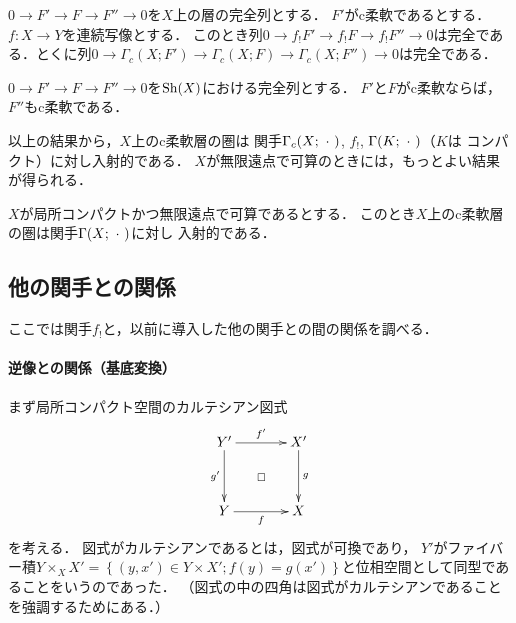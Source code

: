 \begin{leftbar}
\begin{PRP}\label{PRP258}
    \(0\to F'\to F\to F''\to0\)を\(X\)上の層の完全列とする．
    \(F'\)がc柔軟であるとする．\(f\colon X\to Y\)を連続写像とする．
    このとき列\(
        0\to f_{!}F'\to f_{!}F\to f_{!}F''\to0
    \)は完全である．とくに列\(
        0\to\Gamma_{c}(X;F')\to\Gamma_{c}(X;F)\to\Gamma_{c}(X;F'')\to0
    \)は完全である．
\end{PRP}
\end{leftbar}

\begin{leftbar}
\begin{CRL}\label{CRL259}
    \(0\to F'\to F\to F''\to0\)を\(\mathrm{Sh}(X)\)における完全列とする．
    \(F'\)と\(F\)がc柔軟ならば，\(F''\)もc柔軟である．
\end{CRL}
\end{leftbar}

以上の結果から，\(X\)上のc柔軟層の圏は
関手\(\Gamma_{c}(X;\mathord{\ \cdot\ })\), \(f_{!}\), \(\Gamma(K;\mathord{\ \cdot\ })\)（\(K\)は
コンパクト）に対し入射的である．
\(X\)が無限遠点で可算のときには，もっとよい結果が得られる．

\begin{leftbar}
\begin{PRP}\label{PRP2510}
    \(X\)が局所コンパクトかつ無限遠点で可算であるとする．
    このとき\(X\)上のc柔軟層の圏は関手\(\Gamma(X;\mathord{\ \cdot\ })\)に対し
    入射的である．
\end{PRP}
\end{leftbar}

\subsection*{他の関手との関係}

ここでは関手\(f_!\)と，以前に導入した他の関手との間の関係を調べる．
\paragraph{逆像との関係（基底変換）}
まず局所コンパクト空間のカルテシアン図式
\begin{equation}
    \vcenter{\xymatrix@C=36pt@R=36pt{
            Y'
            \ar[r]^-{f'}
            \ar[d]_-{g'}
            \ar@{}[dr]|\square
            &
            X'
            \ar[d]^-{g}
            \\
            Y\ar[r]_-{f}
            &
            X
    }}
\end{equation}
を考える．
図式がカルテシアンであるとは，図式が可換であり，
\(Y'\)がファイバー積\(
    Y\times_{X}X'=\left\{
        (y,x')\in Y\times X';f(y)=g(x')
    \right\}
\)と位相空間として同型であることをいうのであった．
（図式の中の四角は図式がカルテシアンであることを強調するためにある．）


